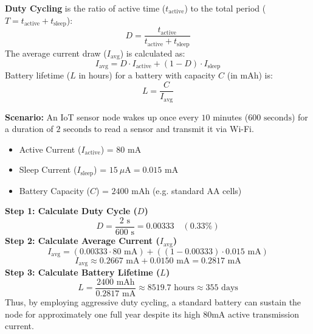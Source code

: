 \documentclass[12pt,a4paper]{article}
\begin{document}
\begin{tcolorbox}[formulabox, title={Duty Cycling \& Battery Life}]
  \textbf{Duty Cycling} is the ratio of active time ($t_{\text{active}}$) to the total period ($T = t_{\text{active}} + t_{\text{sleep}}$):
  \begin{equation}
    D = \frac{t_{\text{active}}}{t_{\text{active}} + t_{\text{sleep}}}
  \end{equation}
  The average current draw ($I_{\text{avg}}$) is calculated as:
  \begin{equation}
    I_{\text{avg}} = D \cdot I_{\text{active}} + (1 - D) \cdot I_{\text{sleep}}
  \end{equation}
  Battery lifetime ($L$ in hours) for a battery with capacity $C$ (in mAh) is:
  \begin{equation}
    L = \frac{C}{I_{\text{avg}}}
  \end{equation}
\end{tcolorbox}

\begin{tcolorbox}[examplebox, title={Numerical Example: IoT Battery Life Calculation}]
  \textbf{Scenario:} An IoT sensor node wakes up once every $10$ minutes ($600\text{ seconds}$) for a duration of $2\text{ seconds}$ to read a sensor and transmit it via Wi-Fi.
  \begin{itemize}[leftmargin=*, itemsep=2.5pt]
    \item Active Current ($I_{\text{active}}$) = $80\text{ mA}$
    \item Sleep Current ($I_{\text{sleep}}$) = $15\ \mu\text{A} = 0.015\text{ mA}$
    \item Battery Capacity ($C$) = $2400\text{ mAh}$ (e.g. standard AA cells)
  \end{itemize}
  \textbf{Step 1: Calculate Duty Cycle ($D$)}
  \begin{equation}
    D = \frac{2\text{ s}}{600\text{ s}} = 0.00333\quad (0.33\%)
  \end{equation}
  \textbf{Step 2: Calculate Average Current ($I_{\text{avg}}$)}
  \begin{equation}
    I_{\text{avg}} = (0.00333 \cdot 80\text{ mA}) + ((1 - 0.00333) \cdot 0.015\text{ mA})
  \end{equation}
  \begin{equation}
    I_{\text{avg}} \approx 0.2667\text{ mA} + 0.0150\text{ mA} = 0.2817\text{ mA}
  \end{equation}
  \textbf{Step 3: Calculate Battery Lifetime ($L$)}
  \begin{equation}
    L = \frac{2400\text{ mAh}}{0.2817\text{ mA}} \approx 8519.7\text{ hours} \approx 355\text{ days}
  \end{equation}
  Thus, by employing aggressive duty cycling, a standard battery can sustain the node for approximately one full year despite its high $80\text{mA}$ active transmission current.
\end{tcolorbox}
\end{document}

